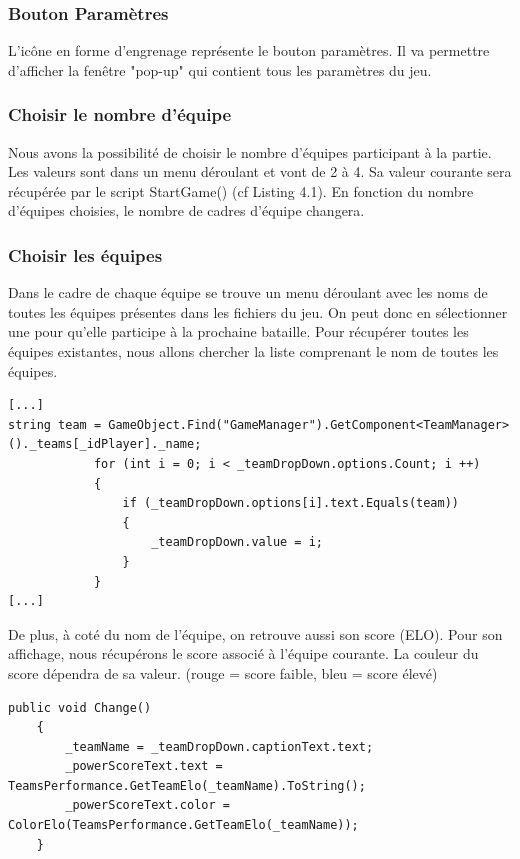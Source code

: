 \documentclass{report}
\begin{document}
\subsubsection{Bouton Paramètres}
L'icône en forme d'engrenage représente le bouton paramètres. Il va permettre d'afficher la fenêtre "pop-up" qui contient tous les paramètres du jeu.
\subsubsection{Choisir le nombre d'équipe}
Nous avons la possibilité de choisir le nombre d'équipes participant à la partie. Les valeurs sont dans un menu déroulant et vont de 2 à 4. Sa valeur courante sera récupérée par le script StartGame() (cf Listing 4.1).\newline
En fonction du nombre d'équipes choisies, le nombre de cadres d'équipe changera.
\subsubsection{Choisir les équipes}
Dans le cadre de chaque équipe se trouve un menu déroulant avec les noms de toutes les équipes présentes dans les fichiers du jeu. On peut donc en sélectionner une pour qu'elle participe à la prochaine bataille.
Pour récupérer toutes les équipes existantes, nous allons chercher la liste comprenant le nom de toutes les équipes.

\begin{lstlisting}[language={[Sharp]C},label={lst:Start()}, caption= Extrait du code de TeamMenuHUD.cs]
[...]
string team = GameObject.Find("GameManager").GetComponent<TeamManager>()._teams[_idPlayer]._name;
            for (int i = 0; i < _teamDropDown.options.Count; i ++)
            {
                if (_teamDropDown.options[i].text.Equals(team))
                {
                    _teamDropDown.value = i;
                }
            }
[...]
\end{lstlisting}
\smallbreak
De plus, à coté du nom de l'équipe, on retrouve aussi son score (ELO). Pour son affichage, nous récupérons le score associé à l'équipe courante. La couleur du score dépendra de sa valeur. (rouge = score faible, bleu = score élevé)

\begin{lstlisting}[language={[Sharp]C},label={lst:Change()}, caption= Extrait du code de TeamMenuHUD.cs]
public void Change()
    {
        _teamName = _teamDropDown.captionText.text;
        _powerScoreText.text = TeamsPerformance.GetTeamElo(_teamName).ToString();
        _powerScoreText.color = ColorElo(TeamsPerformance.GetTeamElo(_teamName));
    }
\end{lstlisting}
\end{document}

